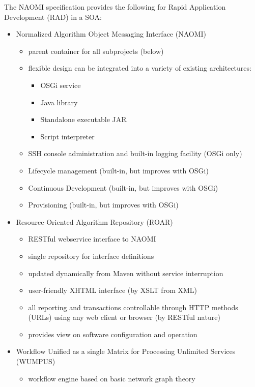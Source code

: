 \documentclass{article}[11pt]
\begin{document}
\par
The NAOMI specification provides the following for Rapid Application Development (RAD) in a SOA:
\begin{itemize}
  \item Normalized Algorithm Object Messaging Interface (NAOMI)
    \begin{itemize}
      \item parent container for all subprojects (below)
      \item flexible design can be integrated into a variety of existing architectures:
      \begin{itemize}
        \item OSGi service
        \item Java library
        \item Standalone executable JAR
        \item Script interpreter
      \end{itemize}
      \item SSH console administration and built-in logging facility (OSGi only)
      \item Lifecycle management (built-in, but improves with OSGi)
      \item Continuous Development (built-in, but improves with OSGi)
      \item Provisioning (built-in, but improves with OSGi)
    \end{itemize}
  \item Resource-Oriented Algorithm Repository (ROAR)
    \begin{itemize}
      \item RESTful webservice interface to NAOMI
      \item single repository for interface definitions
      \item updated dynamically from Maven without service interruption
      \item user-friendly XHTML interface (by XSLT from XML) 
      \item all reporting and transactions controllable through HTTP methods (URLs) using any web client or browser (by RESTful nature)
      \item provides view on software configuration and operation
    \end{itemize}
  \item Workflow Unified as a single Matrix for Processing Unlimited Services (WUMPUS)
    \begin{itemize}
      \item workflow engine based on basic network graph theory

\end{itemize}
\end{itemize}
\end{document}
